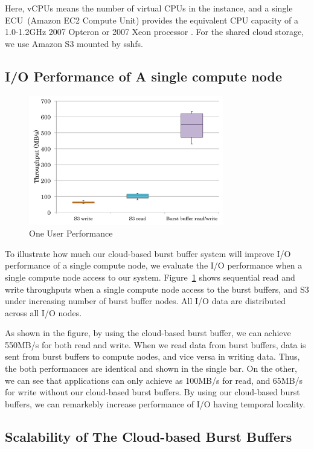 Here, vCPUs means the number of virtual CPUs in the instance, 
and a single ECU~(Amazon EC2 Compute Unit) provides the equivalent CPU capacity
of a 1.0-1.2GHz 2007 Opteron or 2007 Xeon processor .
For the shared cloud storage, we use Amazon S3 mounted by sshfs\cite{sshfs}.

\subsection{I/O Performance of A single compute node}

\begin{figure}
\centering
\includegraphics[width=8.5cm]{img/one_client-2.pdf}
\caption{One User Performance}
\label{evaluation:one user performance}
\end{figure}
To illustrate how much our cloud-based burst buffer system will improve I/O
performance of a single compute node, we evaluate the I/O performance when a
single compute node access to our system.
Figure~\ref{evaluation:one user performance} shows sequential read and write
throughputs when a single compute node access to the burst buffers, and S3
under increasing number of burst buffer nodes. All I/O data are distributed
across all I/O nodes.

As shown in the figure, by using the cloud-based burst buffer, we can 
achieve 550MB/s for both read and write.
When we read data from burst buffers, data is sent from burst buffers to compute
nodes, and vice versa in writing data. Thus, the both performances are identical
and shown in the single bar. On the other, we can see that applications
can only achieve as 100MB/s for read, and 65MB/s for write without our
cloud-based burst buffers. By using our cloud-based burst buffers, 
we can remarkebly increase performance of I/O having temporal
locality.

\subsection{Scalability of The Cloud-based Burst Buffers}

